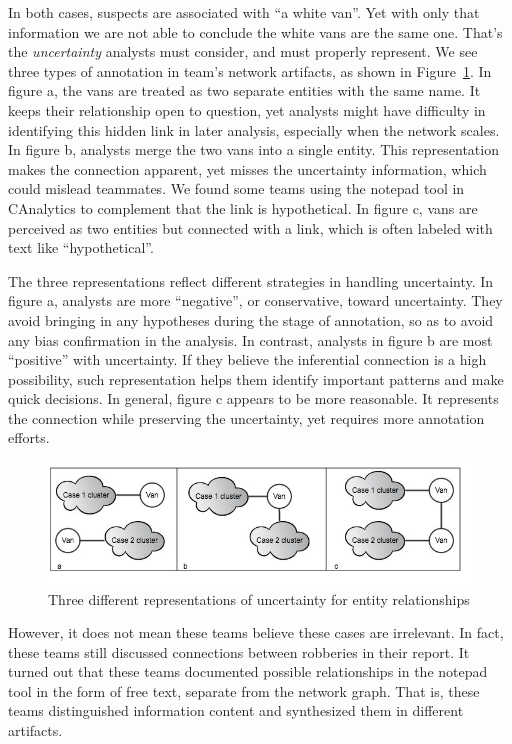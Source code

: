 In both cases, suspects are associated with ``a white van''. Yet with only that information we are not able to conclude the white vans are the same one. That's the \textit{uncertainty} analysts must consider, and must properly represent. We see three types of annotation in team's network artifacts, as shown in Figure~\ref{fig:van}. In figure a, the vans are treated as two separate entities with the same name. It keeps their relationship open to question, yet analysts might have difficulty in identifying this hidden link in later analysis, especially when the network scales. In figure b, analysts merge the two vans into a single entity. This representation makes the connection apparent, yet misses the uncertainty information, which could mislead teammates. We found some teams using the notepad tool in CAnalytics to complement that the link is hypothetical. In figure c, vans are perceived as two entities but connected with a link, which is often labeled with text like ``hypothetical''. 

The three representations reflect different strategies in handling uncertainty. In figure a, analysts are more ``negative'', or conservative, toward uncertainty. They avoid bringing in any hypotheses during the stage of annotation, so as to avoid any bias confirmation in the analysis. In contrast, analysts in figure b are most ``positive'' with uncertainty. If they believe the inferential connection is a high possibility, such representation helps them identify important patterns and make quick decisions. In general, figure c appears to be more reasonable. It represents the connection while preserving the uncertainty, yet requires more annotation efforts. 


\begin{figure}
	\centering
	\includegraphics[width=\columnwidth]{04-Study_one/img/van.jpg}
	\caption{Three different representations of uncertainty for entity relationships\label{fig:van}}
\end{figure}

However, it does not mean these teams believe these cases are irrelevant. In fact, these teams still discussed connections between robberies in their report.
It turned out that these teams documented possible relationships in the notepad tool in the form of free text, separate from the network graph. That is, these teams distinguished information content and synthesized them in different artifacts.


